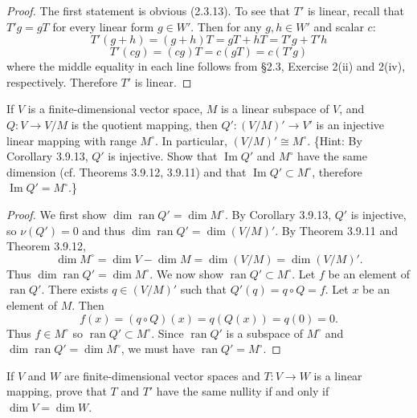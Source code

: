 \begin{proof}
The first statement is obvious (2.3.13). To see that $T'$ is linear, recall 
that $T'g = gT$ for every linear form $g \in W'$. Then for any $g, h \in W'$ 
and scalar $c$:
\[
    T'(g + h) = (g+h)T = gT + hT = T'g + T'h
\]
\[
    T'(cg) = (cg)T = c(gT) = c(T'g)
\]
where the middle equality in each line follows from \S 2.3, Exercise 2(ii) 
and 2(iv), respectively. Therefore $T'$ is linear.
\end{proof}

\begin{tcolorbox}[title=Exercise 2, breakable]
    If $V$ is a finite-dimensional vector space, $M$ is a linear subspace of $V$, 
    and $Q : V \to V/M$ is the quotient mapping, then $Q' : (V/M)' \to V'$ is an 
    injective linear mapping with range $M^\circ$. In particular, $(V/M)' \cong M^\circ$.
    \{Hint: By Corollary 3.9.13, $Q'$ is injective. Show that $\operatorname{Im} Q'$ and $M^\circ$ 
    have the same dimension (cf. Theorems 3.9.12, 3.9.11) and that 
    $\operatorname{Im} Q' \subset M^\circ$, therefore $\operatorname{Im} Q' = M^\circ$.\}
\end{tcolorbox}

\begin{proof}
    We first show $\dim \operatorname{ran} Q' = \dim M^\circ$.
    By Corollary 3.9.13, $Q'$ is injective, so $\nu(Q') = 0$ and thus
    $\dim \operatorname{ran} Q' = \dim(V/M)'$.
    By Theorem 3.9.11 and Theorem 3.9.12,
    \[\dim M^\circ = \dim V - \dim M = \dim(V/M) = \dim (V/M)'.\]
    Thus $\dim \operatorname{ran} Q' = \dim M^\circ$.
    We now show $\operatorname{ran} Q' \subset M^\circ$.
    Let $f$ be an element of $\operatorname{ran} Q'$.
    There exists $q \in (V/M)'$ such that $Q'(q) = q \circ Q = f$.
    Let $x$ be an element of $M$.
    Then 
    \[f(x) = (q \circ Q)(x) = q(Q(x)) = q(0) = 0.\]
    Thus $f \in M^\circ$ so $\operatorname{ran} Q' \subset M^\circ$.
    Since $\operatorname{ran} Q'$ is a subspace of $M^\circ$ and $\dim \operatorname{ran} Q' = \dim M^\circ$,
    we must have $\operatorname{ran} Q' = M^\circ$.
\end{proof}


\begin{tcolorbox}[title=Exercise 3, breakable]
    If $V$ and $W$ are finite-dimensional vector spaces and $T : V \to W$ is a 
    linear mapping, prove that $T$ and $T'$ have the same nullity if and only if 
    $\dim V = \dim W$.
\end{tcolorbox}

